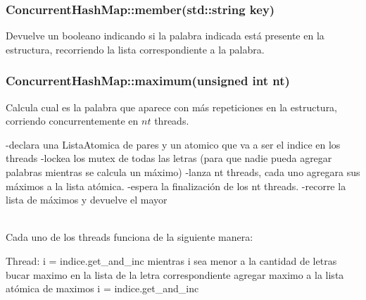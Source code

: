 \subsubsection{ConcurrentHashMap::member(std::string key)}
Devuelve un booleano indicando si la palabra indicada está presente en la estructura, recorriendo la lista correspondiente a la palabra.

\subsubsection{ConcurrentHashMap::maximum(unsigned int nt)}
Calcula cual es la palabra que aparece con más repeticiones en la estructura, corriendo concurrentemente en $nt$ threads.\\
\begin{codesnippet}
 	-declara una ListaAtomica de pares y un atomico que va a ser el indice en los threads
 	-lockea los mutex de todas las letras
 	(para que nadie pueda agregar palabras mientras se calcula un máximo)
 	-lanza nt threads, cada uno agregara sus máximos a la lista atómica.
 	-espera la finalización de los nt threads.
 	-recorre la lista de máximos y devuelve el mayor
\end{codesnippet}\\
Cada uno de los threads funciona de la siguiente manera:\\
\begin{codesnippet}
 	Thread:
 		i = indice.get_and_inc
 		mientras i sea menor a la cantidad de letras
 			bucar maximo en la lista de la letra correspondiente
 			agregar maximo a la lista atómica de maximos
 			i = indice.get_and_inc

\end{codesnippet}\\
